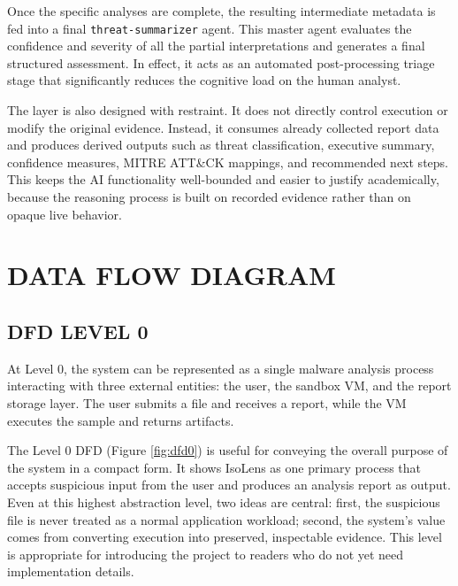 \documentclass[a4paper,12pt,oneside]{report}
\begin{document}
\par

\par

Once the specific analyses are complete, the resulting intermediate metadata is fed into a final \texttt{threat-summarizer} agent. This master agent evaluates the confidence and severity of all the partial interpretations and generates a final structured assessment. In effect, it acts as an automated post-processing triage stage that significantly reduces the cognitive load on the human analyst.

\par

\par

The layer is also designed with restraint. It does not directly control execution or modify the original evidence. Instead, it consumes already collected report data and produces derived outputs such as threat classification, executive summary, confidence measures, MITRE ATT\&CK mappings, and recommended next steps. This keeps the AI functionality well-bounded and easier to justify academically, because the reasoning process is built on recorded evidence rather than on opaque live behavior.

\section{DATA FLOW DIAGRAM}
\subsection{DFD LEVEL 0}
At Level 0, the system can be represented as a single malware analysis process interacting with three external entities: the user, the sandbox VM, and the report storage layer. The user submits a file and receives a report, while the VM executes the sample and returns artifacts.

\par

\par

The Level 0 DFD (Figure \ref{fig:dfd0}) is useful for conveying the overall purpose of the system in a compact form. It shows IsoLens as one primary process that accepts suspicious input from the user and produces an analysis report as output. Even at this highest abstraction level, two ideas are central: first, the suspicious file is never treated as a normal application workload; second, the system’s value comes from converting execution into preserved, inspectable evidence. This level is appropriate for introducing the project to readers who do not yet need implementation details.
\end{document}
